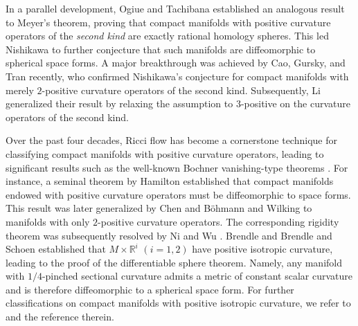 \documentclass[12pt, twoside]{article}
\theoremstyle{definition}
\numberwithin{equation}{section}
\begin{document}
In a parallel development, Ogiue and Tachibana \cite{OT79} established an analogous result to Meyer's theorem, proving that compact manifolds with positive curvature operators of the \textit{second kind} are exactly rational homology spheres. This led Nishikawa \cite{Nis86} to further conjecture that such manifolds are diffeomorphic to spherical space forms. A major breakthrough was achieved by Cao, Gursky, and Tran \cite{CGT23} recently, who confirmed Nishikawa's conjecture for compact manifolds with merely $2$-positive curvature operators of the second kind. Subsequently, Li \cite{Li24} generalized their result by relaxing the assumption to $3$-positive on the curvature operators of the second kind.

Over the past four decades, Ricci flow has become a cornerstone technique for classifying compact manifolds with positive curvature operators, leading to significant results such as the well-known Bochner vanishing-type theorems \cite{Boc46}. For instance, a seminal theorem by Hamilton \cite{Ham82,Ham86} established that compact manifolds endowed with  positive curvature operators must be diffeomorphic to space forms. This result was later  generalized by Chen \cite{Che91} and B\"{o}hmann and Wilking \cite{BW08} to manifolds with only $2$-positive curvature operators. The corresponding rigidity theorem was subsequently resolved by Ni and Wu \cite{NW07}.  Brendle \cite{Bre08} and Brendle and Schoen \cite{BS08,BS09} established that $M\times \mathbb{R}^{i}$ $(i=1,2)$ have positive isotropic curvature, leading to the proof of the differentiable sphere theorem. Namely,  any manifold with $1/4$-pinched  sectional curvature admits a metric of constant scalar curvature and is therefore diffeomorphic to a spherical space form. For further classifications on compact manifolds with positive isotropic curvature, we refer to \cite{Bre19,CTZ12,CZ06,Ham97,Huang23,MM88} and the reference therein.
\end{document}
